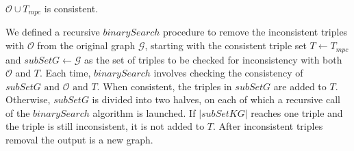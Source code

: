 \documentclass[sigconf]{acmart}
\newcommand{\MostProbableClass}{mpc\xspace}
\begin{document}
\begin{lemma}\label{lemma:consis}
  $\mathcal{O}\cup T_{\MostProbableClass}$ is consistent.
\end{lemma}



We defined a recursive $binarySearch$ procedure to remove the inconsistent triples with $\mathcal{O}$ from the original graph $\mathcal{G}$, starting with the consistent triple set $T \gets T_{\MostProbableClass}$ and 
$subSetG \gets \mathcal{G}$ as the set of triples to be checked for inconsistency with both $\mathcal{O}$ and $T$.  Each time, $binarySearch$ involves checking the consistency of  $subSetG \text{ and } \mathcal{O} \text{ and } T$. When consistent, the triples in $subSetG$ are added to $T$. Otherwise, $subSetG$ is divided into two halves, on each of which a recursive call of the $binarySearch$ algorithm is launched. 
If $|subSetKG|$ reaches one triple and the triple is still inconsistent, it is not added to $T$. After inconsistent triples removal the output is a new graph.
\end{document}
